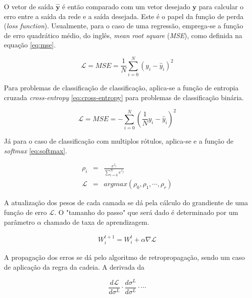 O vetor de saída $\boldsymbol{\hat{y}}$ é então comparado com um vetor desejado 
$\boldsymbol{y}$ para calcular o erro entre a saída da rede e a saída desejada.
Este é o papel da função de perda (\textit{loss function}). 
Usualmente, para o caso de uma regressão, emprega-se a função de erro quadrático médio, 
do inglês, \textit{mean root square} (\textit{MSE}), como definida na equação
\ref{eq:mse}.

\begin{equation}\label{eq:mse}
    \mathcal{L} = MSE = \frac{1}{N} \sum_{i=0}^{N}(y_i - \hat{y}_i)^{2}
\end{equation}

Para problemas de classificação de classificação, aplica-se a função de entropia
cruzada \textit{cross-entropy} \ref{eq:cross-entropy} para problemas de 
classificação binária.

\begin{equation}\label{eq:cross-entropy}
    \mathcal{L} = MSE = - \sum_{i=0}^{N}(\frac{1}{N} y_i - \hat{y}_i)^{2}
\end{equation}

Já para o caso de classificação com multiplos rótulos, aplica-se e a função 
de \textit{softmax} \ref{eq:softmax}.

\begin{eqnarray}
    \rho_i &=& \frac{e^{z_i}}{\sum_{i=0}^{N}e^{z_j}} \\
    \mathcal{L} &=& arg max (\rho_0, \rho_1, \cdots, \rho_r) \label{eq:softmax}
\end{eqnarray}

A atualização dos pesos de cada camada se dá pela cálculo do grandiente
de uma função de erro $\mathcal{L}$. O "tamanho do passo" que será dado
é determinado por um parâmetro $\alpha$ chamado de taxa de aprendizagem.

\begin{eqnarray}\label{eq:atualizacao-parametros-redes}
    W_i^{t + 1} = W_i^{t} + \alpha \nabla \mathcal{L}
\end{eqnarray}

A propagação dos erros se dá pelo algoritmo de retropropagação, sendo um caso 
de aplicação da regra da cadeia. A derivada da 

\begin{equation}\label{eq:derivida-loss}
    \frac{d\mathcal{L}}{d\sigma^{L}} \cdot 
    \frac{d\sigma^{L}}{d\sigma^{L}} \cdot
    \cdots
\end{equation}




